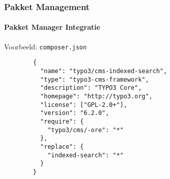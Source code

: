 
\begin{frame}[fragile]
	\frametitle{Pakket Management}
	\framesubtitle{Pakket Manager Integratie}

	Voorbeeld: \texttt{composer.json}

	\lstset{
		basicstyle=\tiny\ttfamily
	}

	\begin{lstlisting}
		{
		  "name": "typo3/cms-indexed-search",
		  "type": "typo3-cms-framework",
		  "description": "TYPO3 Core",
		  "homepage": "http://typo3.org",
		  "license": ["GPL-2.0+"],
		  "version": "6.2.0",
		  "require": {
		    "typo3/cms/-ore": "*"
		  },
		  "replace": {
		    "indexed-search": "*"
		  }
		}
	\end{lstlisting}

\end{frame}


%
%
%
%
%
%
%


